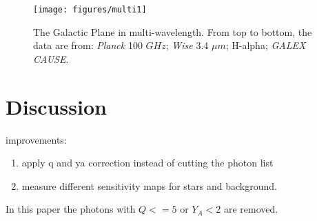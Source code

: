 \documentclass[12pt, preprint]{aastex}
\newcommand{\project}[1]{\textsl{#1}}
\newcommand{\cause}{\project{GALEX CAUSE}}
\begin{document}
\begin{figure}[p]
\begin{center}
\texttt{[image: figures/multi1]}
\end{center}
\caption{
  \label{map4}
  The Galactic Plane in multi-wavelength. From top to bottom, the data are from:
  \project{Planck} 100 $GHz$; \project{Wise} 3.4 $\mu m$; H-alpha; \cause.
}
\end{figure}

\section{Discussion}
\label{ds}
improvements:
\begin{enumerate}
\item apply q and ya correction instead of cutting the photon list
\item measure different sensitivity maps for stars and background.
\end{enumerate}

In this paper the photons with $Q<=5$ or $Y_A<2$ are removed.


\clearpage

\clearpage
\end{document}
